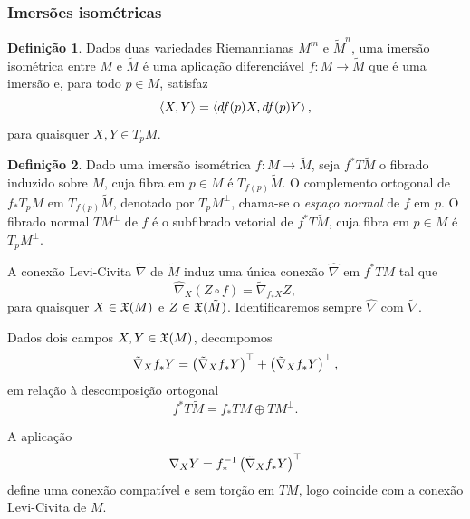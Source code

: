 \documentclass[12pt,a4paper]{beamer}
\theoremstyle{definition}
\newtheorem{definicao}{Definição}
\begin{document}
\begin{frame}[allowframebreaks]
	\frametitle{Imersões isométricas}
	
	\begin{definicao}
		Dados duas variedades Riemannianas $M^m$ e $\tilde{M}^n$, uma imersão isométrica entre $M$ e
		$\tilde{M}$ é uma aplicação diferenciável $f : M \rightarrow \tilde{M}$ que é uma imersão e, para todo $p \in M$, satisfaz
		\begin{equation*}
			\left\langle X,Y \right\rangle = \left\langle df(p) X,df(p) Y \right\rangle,
		\end{equation*}
		para quaisquer $X,Y \in T_p M$.
	\end{definicao}
	
	\begin{definicao}
		Dado uma imersão isométrica $f: M \rightarrow \tilde{M}$, seja $f^* T\tilde{M}$ o fibrado induzido sobre $M$, cuja fibra em $p \in M$ é $T_{f(p)} \tilde{M}$. O complemento ortogonal de $f_* T_p M$ em $T_{f(p)} \tilde{M}$, denotado por $T_p M^\perp$, chama-se o \emph{espaço normal} de $f$ em $p$. O fibrado normal $TM^\perp$ de $f$ é o subfibrado vetorial de $f^* T \tilde{M}$, cuja fibra em $p \in M$ é $T_p M^\perp$.  
	\end{definicao}

	A conexão Levi-Civita $\tilde{\nabla}$ de $\tilde{M}$ induz uma única conexão $\hat{\nabla}$ em $f^* T \tilde{M}$ tal que
	\begin{equation*}
	\hat{\nabla}_X (Z \circ f) = \tilde{\nabla}_{f_* X} Z, 
	\end{equation*}
	para quaisquer $X \in \mathfrak{X}(M)$ e $Z \in \mathfrak{X}(\tilde{M})$. Identificaremos sempre $\hat{\nabla}$ com $\tilde{\nabla}$.
	
	Dados dois campos $X,Y \in \mathfrak{X}(M)$, decompomos
	\begin{equation*}
	\tilde{\nabla}_X f_* Y = \left( \tilde{\nabla}_X f_* Y \right)^\top + \left( \tilde{\nabla}_X f_* Y \right)^\perp,
	\end{equation*}  
	em relação à descomposição ortogonal
	\begin{equation*}
	f^* T \tilde{M} = f_* TM \oplus TM^\perp.
	\end{equation*}
	
	A aplicação
	\begin{equation*}
	\nabla_X Y = f_*^{-1} \left( \tilde{\nabla}_X f_* Y \right)^\top
	\end{equation*}
	define uma conexão compatível e sem torção em $TM$, logo coincide com a conexão Levi-Civita de $M$.
	

\end{frame}
\end{document}
